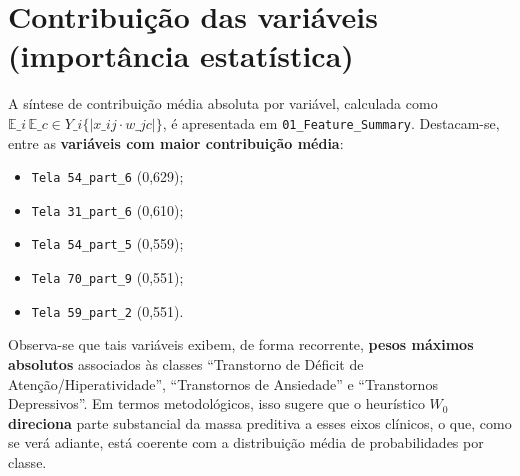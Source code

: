 \documentclass[12pt,a4paper]{article}
\begin{document}
\section{Contribuição das variáveis (importância estatística)}
A síntese de contribuição média absoluta por variável, calculada como $\mathbb{E}\_i\,\mathbb{E}\_{c \in Y\_i} \{|x\_{ij}\cdot w\_{jc}|\}$, é apresentada em \texttt{01\_Feature\_Summary}. Destacam-se, entre as \textbf{variáveis com maior contribuição média}:
\begin{itemize}[leftmargin=1.2cm]
  \item \texttt{Tela 54\_part\_6} (0{,}629);
  \item \texttt{Tela 31\_part\_6} (0{,}610);
  \item \texttt{Tela 54\_part\_5} (0{,}559);
  \item \texttt{Tela 70\_part\_9} (0{,}551);
  \item \texttt{Tela 59\_part\_2} (0{,}551).
\end{itemize}
Observa-se que tais variáveis exibem, de forma recorrente, \textbf{pesos máximos absolutos} associados às classes ``Transtorno de Déficit de Atenção/Hiperatividade'', ``Transtornos de Ansiedade'' e ``Transtornos Depressivos''. Em termos metodológicos, isso sugere que o heurístico $W_0$ \textbf{direciona} parte substancial da massa preditiva a esses eixos clínicos, o que, como se verá adiante, está coerente com a distribuição média de probabilidades por classe.
\end{document}
